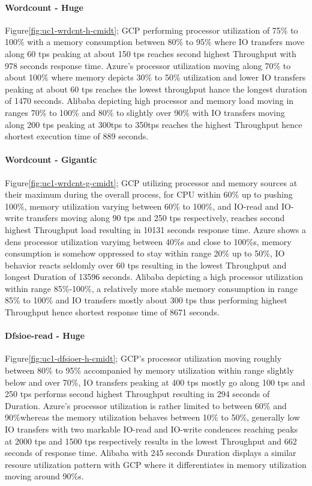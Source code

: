 \documentclass[review]{elsarticle}
\begin{document}
\paragraph{Wordcount - Huge} Figure\ref{fig:uc1-wrdcnt-h-cmidt}; GCP performing processor utilization of 75\% to 100\% with a memory consumption between 80\% to 95\% where IO transfers move along 60 tps peaking at about 150 tps reaches second highest Throughput with 978 seconds response time. Azure's processor utilization moving along 70\% to about 100\% where memory depicts 30\% to 50\% utilization and lower IO transfers peaking at about 60 tps reaches the lowest throughput hance the longest duration of 1470 seconds. Alibaba depicting high processor and memory load moving in ranges 70\% to 100\% and 80\% to slightly over 90\% with IO transfers moving along 200 tps peaking at 300tps to 350tps reaches the highest Throughput hence shortest execution time of 889 seconds.

\paragraph{Wordcount - Gigantic} Figure\ref{fig:uc1-wrdcnt-g-cmidt}; GCP utilizing processor and memory sources at their maximum during the overall process, for CPU within 60\% up to pushing 100\%, memory utilization varying between 60\% to 100\%, and IO-read and IO-write transfers moving along 90 tps and 250 tps respectively, reaches second highest Throughput load resulting in 10131 seconds response time. Azure shows a dens processor utilization varyimg between 40\%s and close to 100\%s, memory consumption is somehow oppressed to stay within range 20\% up to 50\%, IO behavior reacts seldomly over 60 tps resulting in the lowest Throughput and longest Duration of 13596 seconds. Alibaba depicting a high processor utilization within range 85\%-100\%, a relatively more stable memory consumption in range 85\% to 100\% and IO transfers mostly about 300 tps thus performing highest Throughput hence shortest response time of 8671 seconds.

\paragraph{Dfsioe-read - Huge} Figure\ref{fig:uc1-dfsioer-h-cmidt}; GCP's processor utilization moving roughly between 80\% to 95\% accompanied by memory utilization  within range slightly below and over 70\%, IO transfers peaking at 400 tps mostly go along 100 tps and 250 tps performs second highest Throughput resulting in 294 seconds of Duration. Azure's processor utilization is rather limited to between 60\% and 90\%whereas the memory utilization behaves between 10\% to 50\%, generally low IO transfers with two markable IO-read and IO-write condences reaching peaks at 2000 tps and 1500 tps respectively results in the lowest Throughput and 662 seconds of response time. Alibaba with 245 seconds Duration displays a similar resoure utilization pattern with GCP where it differentiates in memory utilization moving around 90\%s.
\end{document}

